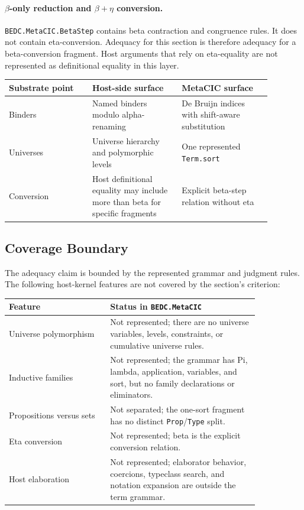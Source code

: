 \paragraph{$\beta$-only reduction and $\beta+\eta$ conversion.}
\texttt{BEDC.MetaCIC.BetaStep} contains beta contraction and congruence
rules. It does not contain eta-conversion. Adequacy for this section is
therefore adequacy for a beta-conversion fragment. Host arguments that rely
on eta-equality are not represented as definitional equality in this layer.

\begin{center}
\begin{tabular}{p{0.28\linewidth}p{0.30\linewidth}p{0.30\linewidth}}
\hline
Substrate point & Host-side surface & MetaCIC surface \\
\hline
Binders & Named binders modulo alpha-renaming & De Bruijn indices with
shift-aware substitution \\
Universes & Universe hierarchy and polymorphic levels & One represented
\texttt{Term.sort} \\
Conversion & Host definitional equality may include more than beta for
specific fragments & Explicit beta-step relation without eta \\
\hline
\end{tabular}
\end{center}

\subsection{Coverage Boundary}
\label{subsec:metacic-coverage-boundary}

The adequacy claim is bounded by the represented grammar and judgment rules.
The following host-kernel features are not covered by the section's criterion:

\begin{center}
\begin{tabular}{p{0.34\linewidth}p{0.50\linewidth}}
\hline
Feature & Status in \texttt{BEDC.MetaCIC} \\
\hline
Universe polymorphism & Not represented; there are no universe variables,
levels, constraints, or cumulative universe rules. \\
Inductive families & Not represented; the grammar has Pi, lambda,
application, variables, and sort, but no family declarations or eliminators. \\
Propositions versus sets & Not separated; the one-sort fragment has no
distinct \texttt{Prop}/\texttt{Type} split. \\
Eta conversion & Not represented; beta is the explicit conversion relation. \\
Host elaboration & Not represented; elaborator behavior, coercions, typeclass
search, and notation expansion are outside the term grammar. \\
\hline
\end{tabular}
\end{center}

